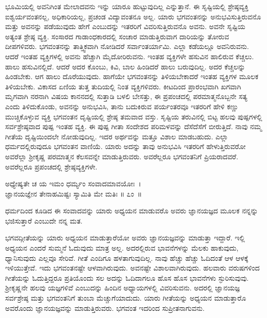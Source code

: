 ಭೂಮಿಯಲ್ಲಿ ಅವನಿಗಿಂತ ಮೇಲಾದವನು ಇನ್ನು ಯಾರೂ ಹುಟ್ಟುವುದಿಲ್ಲ ಎನ್ನುತ್ತಾನೆ. ಈ ಸೃಷ್ಟಿಯಲ್ಲಿ ಶ್ರೇಷ್ಠವ್ಯಕ್ತಿ ಐಶ್ವರ್ಯವಂತನಲ್ಲ, ಅಧಿಕಾರಿಯಲ್ಲ, ಪ್ರಚಂಡ ವಿದ್ಯಾವಂತನೂ ಅಲ್ಲ. ಯಾರು ಭಗವಂತನನ್ನು ಅನುಭವಿಸುತ್ತಿರುವನೊ ಮತ್ತು ಅವನನ್ನು ಪಡೆಯುವುದು ಹೇಗೆ ಎಂಬುದನ್ನು ಇತರರಿಗೆ ವಿವರಿಸುತ್ತಿರುವನೊ ಅವನು. ಅವನೇ ಸೃಷ್ಟಿಯ ಅತ್ಯಂತ ಶ್ರೇಷ್ಠ ವ್ಯಕ್ತಿ. ಸಂಸಾರದ ಗಾಡಾಂಧಕಾರದಲ್ಲಿ ಸಂಚಾರ ಮಾಡುತ್ತಿರುವಾಗ ದಾರಿಯನ್ನು ತೋರುವ ದೀಪಗಳಿವರು. ಭಗವಂತನನ್ನು ತಾತ್ತ್ವಿಕವಾಗಿ ನೋಡಿದರೆ ಸರ್ವಾಂತರ್ಯಾಮಿ. ಎಲ್ಲಾ ಕಡೆಯಲ್ಲೂ ಅವನಿರುವನು. ಆದರೆ ಇಂತಹ ವ್ಯಕ್ತಿಗಳಲ್ಲಿ ಅವನು ಹೆಚ್ಚಾಗಿ ಮೈದೋರಿರುವನು. ಇಂತಹ ವ್ಯಕ್ತಿಗಳೇ ಹಸುವಿನ ಹಾಲಿರುವ ಕೆಚ್ಚಲು. ಹಾಲು ಹಸುವಿನಲ್ಲಿದೆ. ಆದರೆ ಅದರ ಕೊಂಬು, ಕಿವಿ, ಬಾಲ ಹಿಂಡಿದರೆ ಹಾಲು ಬರುವುದಿಲ್ಲ. ಅದರ ಕೆಚ್ಚಲನ್ನು ಹಿಂಡಬೇಕು. ಆಗ ಹಾಲು ದೊರೆಯುವುದು. ಹಾಗೆಯೇ ಭಗವಂತನನ್ನು ತಿಳಿಯಬೇಕಾದರೆ ಇಂತಹ ವ್ಯಕ್ತಿಗಳ ಮೂಲಕ ತಿಳಿಯಬೇಕು. ವಿಕಾಸದ ಏಣಿಯ ತುತ್ತ ತುದಿಯಲ್ಲಿ ನಿಂತ ವ್ಯಕ್ತಿಗಳಿವರು. ಕೀಟದಿಂದ ಪ್ರಾರಂಭವಾಗಿ ಖಗವಾಗಿ ಮೃಗವಾಗಿ ನರನಾಗಿ ವಿಷಯ ಕಾನನದಲ್ಲಿ ಸುತ್ತಾಡಿ ಬಳಲಿ ಬೇಸತ್ತು, ಈ ಪ್ರಪಂಚದಲ್ಲಿ ಪರಮಾತ್ಮನೊಬ್ಬನೇ ಸತ್ಯ ಎಂದು ತಿಳಿದುಕೊಂಡು, ಅವನನ್ನು ಅನುಭವಿಸಿ, ತಾನು ಬದುಕಿರುವ ಪರ್ಯಂತರವೂ ಇತರರಿಗೆ ಹೇಳಿ ಕಣ್ಣು ಮುಚ್ಚಿಕೊಳ್ಳುವ ವ್ಯಕ್ತಿ ಭಗವಂತನ ದೃಷ್ಟಿಯಲ್ಲಿ ಶ್ರೇಷ್ಠ ತಮವಾದ ವಸ್ತು. ಸೃಷ್ಟಿಯ ತರುವಿನಲ್ಲಿ ಬಿಟ್ಟ ಹಲವು ಪುಷ್ಪಗಳಲ್ಲಿ ಸರ್ವಶ್ರೇಷ್ಠವಾದ ಪುಷ್ಪ ಇಂತಹ ವ್ಯಕ್ತಿ. ಈ ಪುಷ್ಪ ಗೀತಾ ಸಂದೇಶದ ಪರಿಮಳವನ್ನು ದೆಸೆದೆಸೆಗೆ ಬೀರುತ್ತಿದೆ. ನಾವು ನಮ್ಮ ಗೀತೆಯ ದೃಷ್ಟಿಯಿಂದಲೇ ನೋಡುವುದಿಲ್ಲ. ಇದರ ಅರ್ಥವನ್ನು ಮತ್ತೂ ವಿಶಾಲ ಮಾಡಬಹುದು. ಎಲ್ಲಾ ಧರ್ಮದಲ್ಲಿರುವುದೂ ಭಗವಂತನ ವಾಣಿಯೆ. ಯಾರು ಅದನ್ನು ತಾವು ಅನುಭವಿಸಿ ಇತರರಿಗೆ ಹೇಳುತ್ತಿರುವರೋ ಅವರೆಲ್ಲಾ ಶ‍್ರೀಕೃಷ್ಣ ಪರಮಾತ್ಮನ ಕೆಲಸವನ್ನೇ ಮಾಡುತ್ತಿರುವರು. ಅವರೆಲ್ಲರೂ ಭಗವಂತನಿಗೆ ಪ್ರಿಯರಾದವರೆ. ಅವರೆಲ್ಲರೂ ಪ್ರಪಂಚದಲ್ಲಿ ಶ್ರೇಷ್ಠವ್ಯಕ್ತಿಗಳೇ.

\begin{shloka}
ಅಧ್ಯೇಷ್ಯತೇ ಚ ಯ ಇಮಂ ಧರ್ಮ್ಯಂ ಸಂವಾದಮಾವಯೋಃ~।\\ಜ್ಞಾನಯಜ್ಞೇನ ತೇನಾಹಮಿಷ್ಟಃ ಸ್ಯಾಮಿತಿ ಮೇ ಮತಿಃ \hfill॥ ೭ಂ~॥
\end{shloka}

\begin{artha}
ಧರ್ಮದಿಂದ ಕೂಡಿದ ಈ ಸಂವಾದವನ್ನು ಯಾರು ಅಧ್ಯಯನ ಮಾಡುವರೊ ಅವರು ಜ್ಞಾನಯಜ್ಞದ ಮೂಲಕ ನನ್ನನ್ನು ಭಜಿಸುತ್ತಾರೆ ಎಂಬುದೇ ನನ್ನ ಮತ.
\end{artha}

ಭಗವದ್ಗೀತೆಯನ್ನು ಯಾರು ಅಧ್ಯಯನ ಮಾಡುತ್ತಾರೆಯೋ ಅವರು ಜ್ಞಾನಯಜ್ಞವನ್ನು ಮಾಡುತ್ತಾ ಇದ್ದಾರೆ. ಇಲ್ಲಿ ಅಧ್ಯಯನ ಎಂದರೆ ಸುಮ್ಮನೆ ಓದುವುದು ಮಾತ್ರ ಅಲ್ಲ. ಅದರಲ್ಲಿರುವ ಭಾವನೆಗಳನ್ನು ಮೆಲಕು ಹಾಕುವುದು, ಧ್ಯಾನಿಸುವುದು ಎಲ್ಲವೂ ಸೇರಿವೆ. ಗೀತೆ ಎಂದಿಗೂ ಹಳತಾಗುವುದಿಲ್ಲ. ನಾವು ಹೆಚ್ಚು ಹೆಚ್ಚು ಓದಿದಂತೆ ಆಳ ಆಳಕ್ಕೆ ಇಳಿಯುತ್ತೇವೆ. ಇದು ಭಗವಂತನಷ್ಟೇ ಆಳವಾಗಿರುವುದು. ಅವನಷ್ಟೇ ವಿಶಾಲವಾಗಿರುವುದು. ಹಲವಾರು ವರುಷಗಳಿಂದ ಗೀತೆಯನ್ನು ಓದುತ್ತಿದ್ದರೂ ಪ್ರತಿಯೊಂದು ಸಲ ಅದನ್ನು ಓದಿದಾಗಲೂ ಹೊಸ ಹೊಸ ಭಾವನೆಗಳು ಸ್ಫುರಿಸುವುವು. ಶ‍್ರೀಕೃಷ್ಣನೇ ಹಲವು ಯಜ್ಞಗಳಿವೆ ಎಂಬುದನ್ನು ಹಿಂದಿನ ಅಧ್ಯಾಯಗಳಲ್ಲಿ ವಿವರಿಸುವನು. ಅದರಲ್ಲಿ ಜ್ಞಾನಯಜ್ಞ ಸರ್ವಶ್ರೇಷ್ಠ ಮತ್ತು ಭಗವಂತನಿಗೆ ತುಂಬಾ ಮೆಚ್ಚುಗೆಯಾದುದು. ಯಾರು ಗೀತೆಯನ್ನು ಅಧ್ಯಯನ ಮಾಡುತ್ತಾರೊ ಅವರೊಂದು ಜ್ಞಾನಯಜ್ಞವನ್ನು ಮಾಡುತ್ತಿರುವರು. ಭಗವಂತ ಇದರಿಂದ ಸುಪ್ರೀತನಾಗುವನು.

